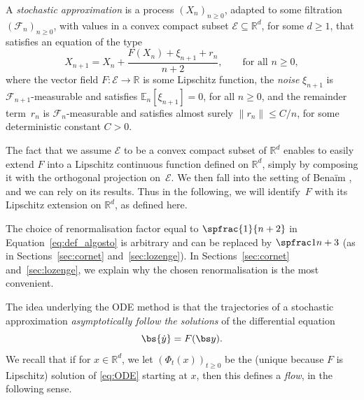 \begin{definition}\label{def.stoc.approx} A \emph{stochastic approximation} is a process $(X_n)_{n\ge 0}$, adapted to some filtration $(\mathcal F_n)_{n\ge 0}$, with values in a convex compact subset $\mathcal E\subseteq \mathbb R^d$, for some $d\ge 1$, that satisfies an equation of the type
\begin{equation}\label{eq:def_algosto}
X_{n+1} = X_n + \frac{F(X_n) + \xi_{n+1}+ r_n}{n+2}, \qquad \text{for all }n\ge 0,
\end{equation}
where the vector field $F: \mathcal E\to \mathbb R$ is some Lipschitz function, the \emph{noise} $\xi_{n+1}$ is $\mathcal F_{n+1}$\nobreakdash-measurable and satisfies $\mathbb E_n[\xi_{n+1}] = 0$, for all $n\ge 0$, and the remainder term~$r_n$ is $\mathcal F_n$-measurable and satisfies almost surely $\|r_n\| \le C/n$, for some deterministic constant $C>0$.
\end{definition}
\begin{remark}
The fact that we assume $\mathcal E$ to be a convex compact subset of $\mathbb R^d$ enables to easily extend $F$ into a Lipschitz continuous function defined on $\mathbb R^d$, simply by composing it with the orthogonal projection on~$\mathcal E$.
We then fall into the setting of Benaïm \cite{Benaim}, and we can rely on its results. Thus in the following, we will identify~$F$ with its Lipschitz extension on $\mathbb R^d$, as defined here.
\end{remark}

{\begin{remark}
The choice of renormalisation factor equal to $\spfrac{1}{n+2}$
in Equation~\eqref{eq:def_algosto} is arbitrary and can be replaced by $\spfrac 1{n+3}$ (as in Sections~\ref{sec:cornet} and~\ref{sec:lozenge}).
In Sections~\ref{sec:cornet} and~\ref{sec:lozenge}, we explain why the chosen renormalisation is the most convenient.
\end{remark}}

The idea underlying the ODE method is that the trajectories of a stochastic approximation \emph{asymptotically follow the solutions} of the differential equation
\begin{equation}\label{eq:ODE}
{\bs{\dot y}} =F({\bs y}).
\end{equation}
We recall that if for $x\in \mathbb R^d$, we let $(\Phi_t(x))_{t\ge 0}$ be the (unique because $F$ is Lipschitz) solution of \eqref{eq:ODE} starting at $x$,
then this defines a \emph{flow}, in the {following sense}.

